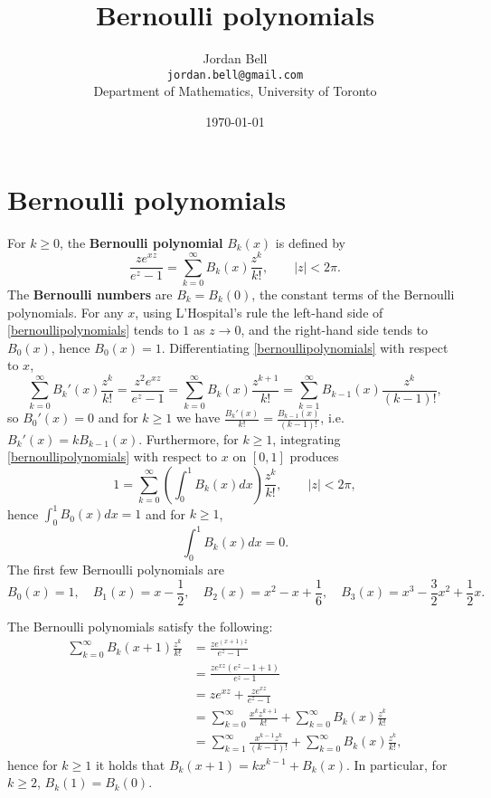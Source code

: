 \documentclass{article}
\theoremstyle{definition}
\begin{document}
\title{Bernoulli polynomials}
\author{Jordan Bell\\ \texttt{jordan.bell@gmail.com}\\Department of Mathematics, University of Toronto}
\date{\today}

\maketitle

\section{Bernoulli polynomials}
For $k \geq 0$, the \textbf{Bernoulli polynomial} $B_k(x)$ is defined by
\begin{equation}
\frac{ze^{xz}}{e^z-1} = \sum_{k=0}^\infty B_k(x) \frac{z^k}{k!},\qquad |z|<2\pi.
\label{bernoullipolynomials}
\end{equation}
The \textbf{Bernoulli numbers} are $B_k = B_k(0)$, the constant terms of the Bernoulli polynomials.
For any $x$, using L'Hospital's rule the left-hand side of \eqref{bernoullipolynomials} tends to $1$ as $z \to 0$, and the right-hand side
tends to $B_0(x)$, hence $B_0(x)=1$. 
Differentiating \eqref{bernoullipolynomials} with respect to $x$,
\[
\sum_{k=0}^\infty B_k'(x) \frac{z^k}{k!} = \frac{z^2 e^{xz}}{e^z-1} = \sum_{k=0}^\infty B_k(x) \frac{z^{k+1}}{k!}
=\sum_{k=1}^\infty B_{k-1}(x) \frac{z^k}{(k-1)!},
\]
so $B_0'(x) = 0$ and for $k \geq 1$ we have $\frac{B_k'(x)}{k!} = \frac{B_{k-1}(x)}{(k-1)!}$, i.e.
$B_k'(x)=k B_{k-1}(x)$. Furthermore, for $k \geq 1$, integrating \eqref{bernoullipolynomials} with respect
to $x$ on $[0,1]$ produces
\[
1 = \sum_{k=0}^\infty \left( \int_0^1 B_k(x) dx \right) \frac{z^k}{k!},\qquad |z|<2\pi,
\]
hence $\int_0^1 B_0(x) dx =1$ and for $k \geq 1$,
\[
\int_0^1 B_k(x) dx = 0.
\] 
The first few Bernoulli polynomials are
\[
B_0(x)=1,\quad B_1(x) = x-\frac{1}{2},\quad B_2(x) = x^2-x+\frac{1}{6},
\quad B_3(x)=x^3-\frac{3}{2}x^2+\frac{1}{2}x.
\]


The Bernoulli polynomials  satisfy the following:
\begin{align*}
\sum_{k=0}^\infty B_k(x+1) \frac{z^k}{k!}&=\frac{ze^{(x+1)z}}{e^z-1}\\
&=\frac{ze^{xz} (e^z-1+1)}{e^z-1}\\
&=ze^{xz}+\frac{ze^{xz}}{e^z-1}\\
&=\sum_{k=0}^\infty \frac{x^k z^{k+1}}{k!} + \sum_{k=0}^\infty B_k(x) \frac{z^k}{k!}\\
&=\sum_{k=1}^\infty \frac{x^{k-1} z^k}{(k-1)!} +  \sum_{k=0}^\infty B_k(x) \frac{z^k}{k!},
\end{align*}
hence for $k \geq 1$ it holds that $B_k(x+1) = kx^{k-1} + B_k(x)$. In particular, for $k \geq 2$,
$B_k(1)=B_k(0)$.
\end{document}
